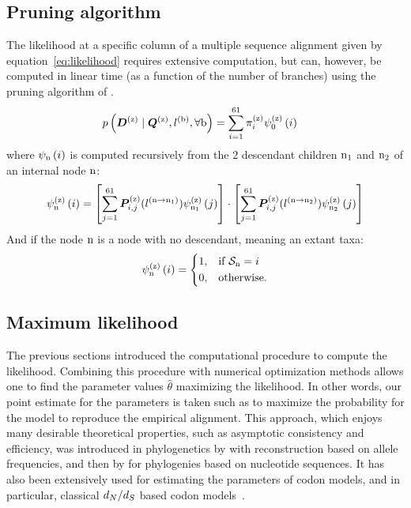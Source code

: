 \subsection{Pruning algorithm}
The likelihood at a specific column of a multiple sequence alignment given by equation~\ref{eq:likelihood} requires extensive computation, but can, however, be computed in linear time (as a function of the number of branches) using the pruning algorithm of \citet{Felsenstein1981}.
\begin{align}
    p\left(\bm{D}^{(\text{z})} \mid \bm{Q}^{(\text{z})}, l^{(\text{b})}, \forall \text{b} \right) & = \sum\limits_{{i}=1}^{61} \pi^{(\text{z})}_{{i}} \psi^{(\text{z})}_{0} \left( {i} \right)
\end{align}
where $\psi_{\text{n}} \left( {i} \right)$ is computed recursively from the $2$ descendant children $\text{n}_{1}$ and $\text{n}_{2}$ of an internal node $\text{n}$:
\begin{align}
    \psi^{(\text{z})}_{\text{n}} \left( {i} \right) =
    \left[ \sum\limits_{{j}=1}^{61}\bm{P}^{(\text{z})}_{{i}, {j}}(l^{(\text{n} \to \text{n}_{1})}) \psi^{(\text{z})}_{\text{n}_{1}} \left( {j} \right) \right]
    \cdot
    \left[ \sum\limits_{{j}=1}^{61}\bm{P}^{(\text{z})}_{{i}, {j}}(l^{(\text{n} \to \text{n}_{2})}) \psi^{(\text{z})}_{\text{n}_{2}} \left( {j} \right) \right]
\end{align}
And if the node $\text{n}$ is a node with no descendant, meaning an extant taxa:
\begin{align}
    \psi^{(\text{z})}_{\text{n}} \left( {i} \right) =
    \begin{dcases}
        1, & \text{if } \mathcal{S}_{\text{n}} = {i} \\
        0, & \text{otherwise.}
    \end{dcases}
\end{align}

\subsection{Maximum likelihood}

The previous sections introduced the computational procedure to compute the likelihood.
Combining this procedure with numerical optimization methods allows one to find the parameter values $\widehat{\theta}$ maximizing the likelihood.
In other words, our point estimate for the parameters is taken such as to maximize the probability for the model to reproduce the empirical alignment.
This approach, which enjoys many desirable theoretical properties, such as asymptotic consistency and efficiency, was introduced in phylogenetics by \citet{Cavalli-Sforza1967} with reconstruction based on allele frequencies, and then by \citet{Felsenstein1981} for phylogenies based on nucleotide sequences.
It has also been extensively used for estimating the parameters of codon models, and in particular, classical $d_N / d_S$ based codon models~\citep{Yang1997a,Pond2005,Dutheil2006,Yang2007,Gueguen2013,KosakovskyPond2020}.


